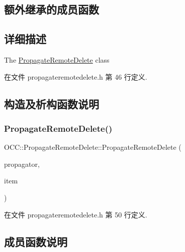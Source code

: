 \subsection*{额外继承的成员函数}


\subsection{详细描述}
The \hyperlink{class_o_c_c_1_1_propagate_remote_delete}{Propagate\+Remote\+Delete} class 

在文件 propagateremotedelete.\+h 第 46 行定义.



\subsection{构造及析构函数说明}
\mbox{\label{class_o_c_c_1_1_propagate_remote_delete_aab08a1628b9ea0a0067eb4f6361f29ce}} 
\subsubsection{\texorpdfstring{Propagate\+Remote\+Delete()}{PropagateRemoteDelete()}}
{\footnotesize\ttfamily O\+C\+C\+::\+Propagate\+Remote\+Delete\+::\+Propagate\+Remote\+Delete (\begin{DoxyParamCaption}\item[{\hyperlink{class_o_c_c_1_1_owncloud_propagator}{Owncloud\+Propagator} $\ast$}]{propagator,  }\item[{const \hyperlink{namespace_o_c_c_acb6b0db82893659fbd0c98d3c5b8e2b8}{Sync\+File\+Item\+Ptr} \&}]{item }\end{DoxyParamCaption})}



在文件 propagateremotedelete.\+h 第 50 行定义.



\subsection{成员函数说明}
\mbox{\label{class_o_c_c_1_1_propagate_remote_delete_aae847c982bf4a7470799cf905e2357ee}} 
